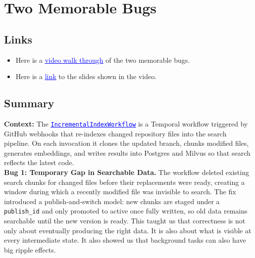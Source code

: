 \documentclass[a4paper,12pt]{article}
\newcommand{\bluehref}[2]{\href{#1}{\textcolor{blue}{\uline{#2}}}}
\begin{document}
\newpage
\section{Two Memorable Bugs}

\subsection{Links}
\begin{itemize}
    \item Here is a \bluehref{https://youtu.be/lVmJs_g7dEQ}{video walk through} of the two memorable bugs.
    \item Here is a \bluehref{https://docs.google.com/presentation/d/1oTm824FbHy6FvsnDb1Oj1ypalQ6g7qS3t5RsoxHJR8k/edit?usp=sharing}{link} to the slides shown in the video.
\end{itemize}

\subsection{Summary}

\textbf{Context:} The \bluehref{https://github.com/UofT-CSC490-W2026/Lighthouse/blob/a5/services/ingestion/src/ingestion/temporal/workflows/incremental.py}{\texttt{IncrementalIndexWorkflow}} is a Temporal workflow
triggered by GitHub webhooks that re-indexes changed repository files into the search
pipeline. On each invocation it clones the updated branch, chunks modified files,
generates embeddings, and writes results into Postgres and Milvus so that search
reflects the latest code. \\

\textbf{Bug 1: Temporary Gap in Searchable Data.} The workflow deleted existing
search chunks for changed files before their replacements were ready, creating a
window during which a recently modified file was invisible to search. The fix
introduced a publish-and-switch model: new chunks are staged under a
\texttt{publish\_id} and only promoted to active once fully written, so old data
remains searchable until the new version is ready. This taught us that correctness
is not only about eventually producing the right data. It is
also about what is visible at every intermediate state. It also showed us that background tasks can also have big ripple effects.
\\
\end{document}
